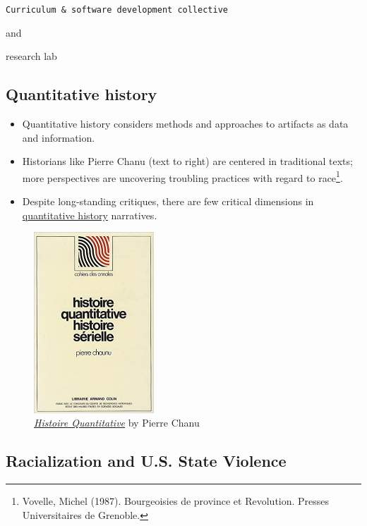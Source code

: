 \documentclass[
  letterpaper,
  DIV=11,
  numbers=noendperiod]{scrartcl}
\begin{document}
\texttt{Curriculum\ \&\ software\ development\ collective}

and

{research lab}

\hypertarget{quantitative-history}{%
\subsection{Quantitative history}\label{quantitative-history}}

\begin{itemize}
\item
  Quantitative history considers methods and approaches to artifacts as
  data and information.
\item
  Historians like Pierre Chanu (text to right) are centered in
  traditional texts; more perspectives are uncovering troubling
  practices with regard to race\footnote{Vovelle, Michel (1987).
    Bourgeoisies de province et Revolution. Presses Universitaires de
    Grenoble.}.
\item
  Despite long-standing critiques, there are {few critical dimensions}
  in \protect\hyperlink{quantitative-history}{quantitative history}
  narratives.
\end{itemize}

\begin{figure}

{\centering \includegraphics[width=0.4\textwidth,height=\textheight]{quanthist.jpg}

}

\caption{\href{https://www.jstor.org/stable/1876930}{\emph{Histoire
Quantitative}} by Pierre Chanu}

\end{figure}

\hypertarget{racialization-and-u.s.-state-violence}{%
\subsection{Racialization and U.S. State
Violence}\label{racialization-and-u.s.-state-violence}}
\end{document}
